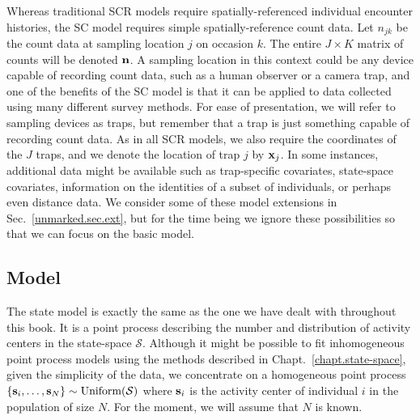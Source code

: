 Whereas traditional SCR models require spatially-referenced
individual encounter histories, the SC model requires simple
spatially-reference count data.
Let $n_{jk}$ be the count data at sampling location $j$
on occasion $k$. The entire $J \times K$ matrix of
counts will be denoted $\bf{n}$. A sampling location in this context
could be any device capable of recording count data, such as a
human observer or a camera trap, and
one of the benefits of the SC model is that it
can be applied to data collected using many different survey
methods. For ease of presentation, we will refer to sampling devices
as traps, but remember that a trap is just something capable of
recording count data. As in all SCR models, we also require the
coordinates of the $J$ traps, and we denote the location of trap $j$
by ${\bf x}_j$. In some instances, additional data might be available such as
trap-specific covariates, state-space covariates,
information on the identities of a subset of individuals, or perhaps
even distance data. We consider some of these model extensions in
Sec.~\ref{unmarked.sec.ext}, but for the time being we ignore these %
possibilities so that we can focus on the basic model.


\subsection{Model}

The state model is exactly the same as the one we have dealt with
throughout
this book. It is a point process describing the number and distribution of
activity centers in the state-space $\mathcal{S}$. Although it might
be possible to fit inhomogeneous point process models using the
methods described in Chapt.~\ref{chapt.state-space},
given the simplicity of the data, we concentrate on a homogeneous point process
$\{{\bf s}_i, \ldots, {\bf s}_N\} \sim \text{Uniform}(\mathcal{S})$
where ${\bf s}_i$ is the activity center of individual $i$ in the
population of size $N$. For the moment, we will assume that $N$ is
known.

